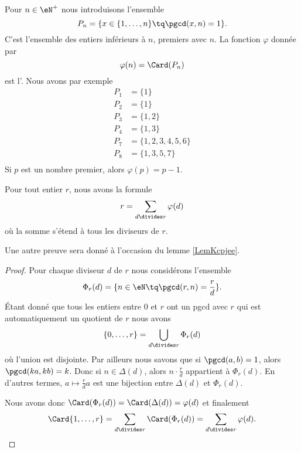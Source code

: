 Pour \( n\in\eN^+\) nous introduisons l'ensemble
\begin{equation}    \label{EqDefPnEntierldeost}
    P_n=\{ x\in\{ 1,\ldots,n \}\tq\pgcd(x,n)=1 \}.
\end{equation}
C'est l'ensemble des entiers inférieurs à \( n\), premiers avec \( n\). La fonction \( \varphi\) donnée par
\begin{equation}    \label{EqEulerGqPsvi}
    \varphi(n)=\Card(P_n)
\end{equation}
est l'. Nous avons par exemple
\begin{subequations}
    \begin{align}
        P_1&=\{ 1 \}\\
        P_2&=\{ 1 \}\\
        P_3&=\{ 1,2 \}\\
        P_4&=\{ 1,3 \}\\
        P_7&=\{ 1,2,3,4,5,6 \}\\
        P_8&=\{ 1,3,5,7 \}\\
    \end{align}
\end{subequations}
Si \( p\) est un nombre premier, alors \( \varphi(p)=p-1\).

\begin{proposition}
    Pour tout entier \( r\), nous avons la formule
    \begin{equation}
        r=\sum_{d\divides r}\varphi(d)
    \end{equation}
    où la somme s'étend à tous les diviseurs de \( r\).
\end{proposition}
Une autre preuve sera donné à l'occasion du lemme \ref{LemKcpjee}.

\begin{proof}
    Pour chaque diviseur \( d\) de \( r\) nous considérons l'ensemble
    \begin{equation}
        \Phi_r(d)=\{ n\in \eN\tq \pgcd(r,n)=\frac{ r }{ d } \}.
    \end{equation}
    Étant donné que tous les entiers entre \( 0\) et \( r\) ont un pgcd avec \( r\) qui est automatiquement un quotient de \( r\) nous avons
    \begin{equation}
        \{ 0,\ldots, r \}=\bigcup_{d\divides r}\Phi_r(d)
    \end{equation}
    où l'union est disjointe. Par ailleurs nous savons que si \( \pgcd(a,b)=1\), alors \( \pgcd(ka,kb)=k\). Donc si \( n\in \Delta(d)\), alors \( n\cdot \frac{ r }{ d }\) appartient à \( \Phi_r(d)\). En d'autres termes, \( a\mapsto \frac{ r }{ d }a\) est une bijection entre \( \Delta(d)\) et \( \Phi_r(d)\).

    Nous avons donc \( \Card(\Phi_r(d))=\Card(\Delta(d))=\varphi(d)\) et finalement
    \begin{equation}
        \Card\{ 1,\ldots, r \}=\sum_{d\divides r}\Card(\Phi_r(d))=\sum_{d\divides r}\varphi(d).
    \end{equation}
\end{proof}


